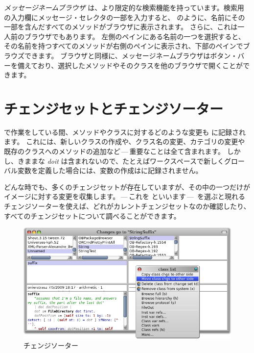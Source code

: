 \documentclass[a4paper,10pt,twoside]{book}
\begin{document}
\emph{メッセージネームブラウザ} は、より限定的な検索機能を持っています。検索用の入力欄にメッセージ・セレクタの一部を入力すると、 のように、名前にその一部を含んだすべてのメソッドがブラウザに表示されます。
さらに、これは一人前のブラウザでもあります。
左側のペインにある名前の一つを選択すると、その名前を持つすべてのメソッドが右側のペインに表示され、下部のペインでブラウズできます。
ブラウザと同様に、メッセージネームブラウザはボタン・バーを備えており、選択したメソッドやそのクラスを他のブラウザで開くことができます。



\section{チェンジセットとチェンジソーター}

\pharo で作業をしている間、メソッドやクラスに対するどのような変更も  に記録されます。
これには、新しいクラスの作成や、クラス名の変更、カテゴリの変更や既存のクラスへのメソッドの追加など\,---\,重要なことは全て含まれます。
しかし、きままな \emph{doit} は含まれないので、たとえばワークスペースで新しくグローバル変数を定義した場合には、変数の作成はに記録されません。

どんな時でも、多くのチェンジセットが存在していますが、その中の一つだけがイメージに対する変更を収集します。\,---\,これを  といいます\,---\,
を選ぶと現れるチェンジソーターを使えば、どれがカレントチェンジセットなのか確認したり、すべてのチェンジセットについて調べることができます。

\begin{figure}[btp]
\begin{center}
\includegraphics[width=\linewidth]{changeSorter}
\end{center}
\caption{チェンジソーター}
\end{figure}
\end{document}
